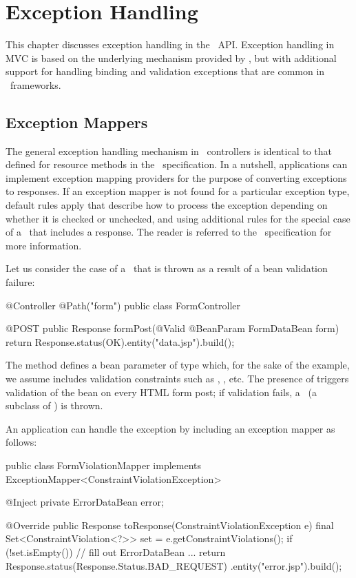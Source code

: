 \chapter{Exception Handling}
\label{exception_handling}

This chapter discusses exception handling in the \mvc\ API. Exception handling in MVC 
is based on the underlying mechanism provided by \jaxrs, but with additional support for 
handling binding and validation exceptions that are common in \mvc\ frameworks.

\section{Exception Mappers}
\label{exception_mappers}

The general exception handling mechanism in \mvc\  controllers is identical to that defined
for resource methods in the \jaxrs\ specification. In a nutshell, applications can 
implement exception mapping providers for the purpose of converting exceptions to 
responses. If an exception mapper is not found for a particular exception type, 
default rules apply that describe how to process the exception depending on whether
it is checked or unchecked, and using additional rules for
the special case of a \WebAppExc\ that includes a response. The reader is referred
to the \jaxrs\ specification for more information.

Let us consider the case of a \ConstVioExc\ that is thrown as a result of a bean validation
failure:

\begin{listing}{1}
@Controller
@Path("form")
public class FormController {

    @POST
    public Response formPost(@Valid @BeanParam FormDataBean form) {
        return Response.status(OK).entity("data.jsp").build();    
    }
}
\end{listing}

The method  defines a bean parameter of type 
which, for the sake of the example, we assume includes validation constraints
such as , , etc. The presence of  triggers
validation of the bean on every HTML form post; if validation fails, a 
\ConstVioExc\ (a subclass of \ValExc) is thrown. 

An application can handle the exception by including an exception mapper as follows:

\begin{listing}{1}
public class FormViolationMapper 
             implements ExceptionMapper<ConstraintViolationException> {

    @Inject
    private ErrorDataBean error;

    @Override
    public Response toResponse(ConstraintViolationException e) {
        final Set<ConstraintViolation<?>> set = e.getConstraintViolations();
        if (!set.isEmpty()) {
            // fill out ErrorDataBean ...
        }
        return Response.status(Response.Status.BAD_REQUEST)
                       .entity("error.jsp").build();
    }
}
\end{listing}

